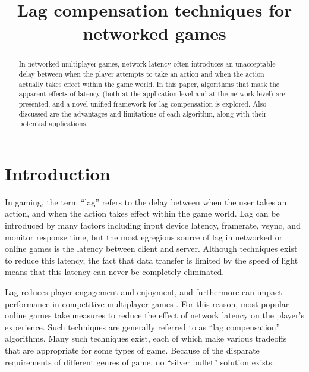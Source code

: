 \documentclass[conference]{IEEEtran}
\begin{document}
	\title{Lag compensation techniques for networked games}
	\author{
	}
	\maketitle

	\begin{abstract}
		In networked multiplayer games, network latency often introduces an unacceptable delay between when the player attempts to take an action and when the action actually takes effect within the game world. In this paper, algorithms that mask the apparent effects of latency (both at the application level and at the network level) are presented, and a novel unified framework for lag compensation is explored. Also discussed are the advantages and limitations of each algorithm, along with their potential applications.
	\end{abstract}

	\section{Introduction}


	In gaming, the term ``lag'' refers to the delay between when the user takes an action, and when the action takes effect within the game world. Lag can be introduced by many factors including input device latency, framerate, vsync, and monitor response time, but the most egregious source of lag in networked or online games is the latency between client and server. Although techniques exist to reduce this latency, the fact that data transfer is limited by the speed of light means that this latency can never be completely eliminated.

	Lag reduces player engagement and enjoyment, and furthermore can impact performance in competitive multiplayer games \cite{beigbeder2004effects}. For this reason, most popular online games take measures to reduce the effect of network latency on the player's experience. Such techniques are generally referred to as ``lag compensation'' algorithms. Many such techniques exist, each of which make various tradeoffs that are appropriate for some types of game. Because of the disparate requirements of different genres of game, no ``silver bullet'' solution exists.
\end{document}
